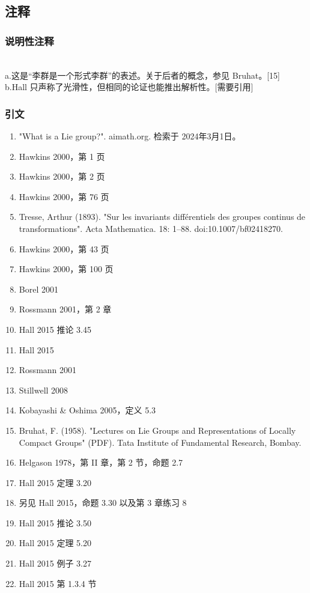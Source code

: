 \subsection{注释}
\subsubsection{说明性注释}\\
a.这是“李群是一个形式李群”的表述。关于后者的概念，参见 Bruhat。[15]\\
b.Hall 只声称了光滑性，但相同的论证也能推出解析性。[需要引用]
\subsubsection{引文}
\begin{enumerate}
\item "What is a Lie group?". aimath.org. 检索于 2024年3月1日。
\item Hawkins 2000，第 1 页
\item Hawkins 2000，第 2 页
\item Hawkins 2000，第 76 页
\item Tresse, Arthur (1893). "Sur les invariants différentiels des groupes continus de transformations". Acta Mathematica. 18: 1–88. doi:10.1007/bf02418270.
\item Hawkins 2000，第 43 页
\item Hawkins 2000，第 100 页
\item Borel 2001
\item Rossmann 2001，第 2 章
\item Hall 2015 推论 3.45
\item Hall 2015
\item Rossmann 2001
\item Stillwell 2008
\item Kobayashi & Oshima 2005，定义 5.3
\item Bruhat, F. (1958). "Lectures on Lie Groups and Representations of Locally Compact Groups" (PDF). Tata Institute of Fundamental Research, Bombay.
\item Helgason 1978，第 II 章，第 2 节，命题 2.7
\item Hall 2015 定理 3.20
\item 另见 Hall 2015，命题 3.30 以及第 3 章练习 8
\item Hall 2015 推论 3.50
\item Hall 2015 定理 5.20
\item Hall 2015 例子 3.27
\item Hall 2015 第 1.3.4 节

\end{enumerate}
